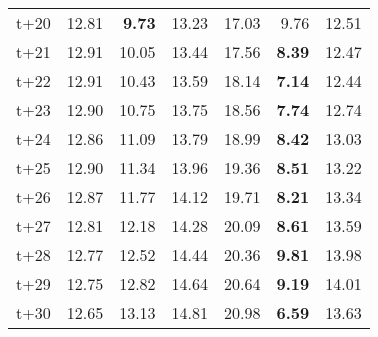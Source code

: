 \begin{table}[H]
\begin{tabular}{lrrrrrr}
t+20  & 12.81  & \textbf{9.73}  & 13.23  & 17.03  & 9.76  & 12.51  \\
t+21  & 12.91  & 10.05  & 13.44  & 17.56  & \textbf{8.39}  & 12.47  \\
t+22  & 12.91  & 10.43  & 13.59  & 18.14  & \textbf{7.14}  & 12.44  \\
t+23  & 12.90  & 10.75  & 13.75  & 18.56  & \textbf{7.74}  & 12.74  \\
t+24  & 12.86  & 11.09  & 13.79  & 18.99  & \textbf{8.42}  & 13.03  \\
t+25  & 12.90  & 11.34  & 13.96  & 19.36  & \textbf{8.51}  & 13.22  \\
t+26  & 12.87  & 11.77  & 14.12  & 19.71  & \textbf{8.21}  & 13.34  \\
t+27  & 12.81  & 12.18  & 14.28  & 20.09  & \textbf{8.61}  & 13.59  \\
t+28  & 12.77  & 12.52  & 14.44  & 20.36  & \textbf{9.81}  & 13.98  \\
t+29  & 12.75  & 12.82  & 14.64  & 20.64  & \textbf{9.19}  & 14.01  \\
t+30  & 12.65  & 13.13  & 14.81  & 20.98  & \textbf{6.59}  & 13.63  \\

\bottomrule
\end{tabular}
\end{table}
